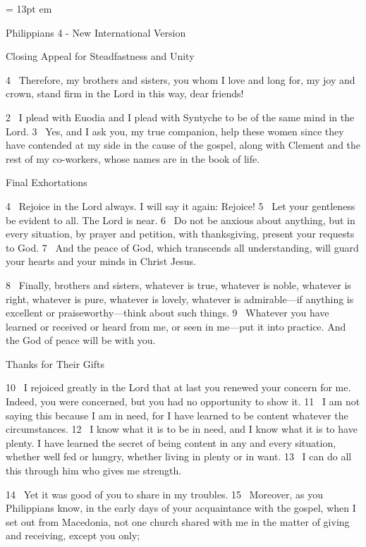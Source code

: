 
\FFrh \baselineskip = 13pt
 em


\centerline{  \FFbg
Philippians 4 - New International Version }

\par
Closing Appeal for Steadfastness and Unity
\par
4 
Therefore, my brothers and sisters, you whom I love and long for,
my joy and crown, stand firm
in the Lord in this way, dear friends!
\par
2 
I plead with Euodia and I plead with Syntyche to be of the same mind
in the Lord.
3 
Yes, and I ask you, my true companion, help these women since they have contended at my side in the cause of the gospel, along with Clement and the rest of my co-workers,
whose names are in the book of life.
\par
Final Exhortations
\par
4 
Rejoice in the Lord always. I will say it again: Rejoice!
5 
Let your gentleness be evident to all. The Lord is near.
6 
Do not be anxious about anything,
but in every situation, by prayer and petition, with thanksgiving, present your requests to God.
7 
And the peace of God,
which transcends all understanding,
will guard your hearts and your minds in Christ Jesus.
\par
8 
Finally, brothers and sisters, whatever is true, whatever is noble, whatever is right, whatever is pure, whatever is lovely, whatever is admirable—if anything is excellent or praiseworthy—think about such things.
9 
Whatever you have learned or received or heard from me, or seen in me—put it into practice.
And the God of peace
will be with you.
\par
Thanks for Their Gifts
\par
10 
I rejoiced greatly in the Lord that at last you renewed your concern for me.
Indeed, you were concerned, but you had no opportunity to show it.
11 
I am not saying this because I am in need, for I have learned to be content
whatever the circumstances.
12 
I know what it is to be in need, and I know what it is to have plenty. I have learned the secret of being content in any and every situation, whether well fed or hungry,
whether living in plenty or in want.
13 
I can do all this through him who gives me strength.
\par
14 
Yet it was good of you to share
in my troubles.
15 
Moreover, as you Philippians know, in the early days
of your acquaintance with the gospel, when I set out from Macedonia,
not one church shared with me in the matter of giving and receiving, except you only;
